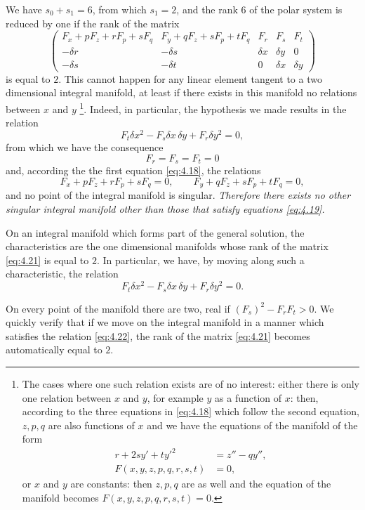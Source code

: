 We have $s_{0}+s_{1}=6$, from which $s_{1}=2$, and the rank $6$ of the polar system is reduced by one if the rank of the matrix
\begin{equation}
  \label{eq:4.21}
  \begin{pmatrix}
    F_{x}+pF_{z}+rF_{p}+sF_{q}& F_{y}+qF_{z}+sF_{p}+tF_{q}& F_{r}& F_{s}& F_{t}\\
-\delta r&-\delta s&\delta x&\delta y&0\\
-\delta s&-\delta t& 0&\delta x&\delta y
  \end{pmatrix}
\end{equation}
is equal to $2$. This cannot happen for any  linear element tangent to a two dimensional integral manifold, at least if there exists in this manifold no relations between $x$ and $y$ \footnote{The cases where one such relation exists are of no interest: either there is only one relation between $x$ and $y$, for example $y$ as a function of $x$: then, according to the three equations in \eqref{eq:4.18} which follow the second equation, $z,p,q$ are also functions of $x$ and we have the equations of the manifold of the form
  \begin{align*}
    r+2sy'+ty'^{2}&=z''-qy'',\\
    F(x,y,z,p,q,r,s,t)&=0,
  \end{align*}
  or $x$ and $y$ are constants: then $z,p,q$ are as well and the equation of the manifold becomes $F(x,y,z,p,q,r,s,t)=0$.
}. Indeed, in particular, the hypothesis we made results in the relation
\[
F_{t}\delta x^{2}-F_{s}\delta x\,\delta y+F_{r}\delta y^{2}=0,
\]
from which we have the consequence
\[
F_{r}=F_{s}=F_{t}=0
\]
and, according the the first equation \eqref{eq:4.18}, the relations
\[
F_{x}+pF_{z}+rF_{p}+sF_{q}=0,\qquad F_{y}+q F_{z}+sF_{p}+tF_{q}=0,
\]
and no point of the integral manifold is singular. \emph{Therefore there exists no other singular integral manifold other than those that satisfy equations \eqref{eq:4.19}.}

On an integral manifold which forms part of the general solution, the characteristics are the one dimensional manifolds whose rank of the matrix \eqref{eq:4.21} is equal to $2$. In particular, we have, by moving along such a characteristic, the relation
\begin{equation}
  \label{eq:4.22}
  F_{t}\delta x^{2}-F_{s}\delta x\,\delta y+F_{r}\delta y^{2}=0.
\end{equation}

On every point of the manifold there are two, real if $(F_{s})^{2}-F_{r}F_{t}>0$. We quickly verify that if we move on the integral manifold in a manner which satisfies the relation \eqref{eq:4.22}, the rank of the matrix \eqref{eq:4.21} becomes automatically equal to $2$.

